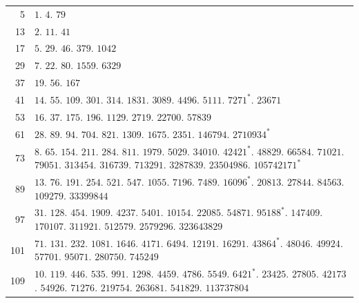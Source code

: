 \begin{longtable}{@{}r|p{\dimexpr\linewidth-38pt\relax}@{}}
5 & $1$. $4$. $79$\\
13 & $2$. $11$. $41$\\
17 & $5$. $29$. $46$. $379$. $1042$\\
29 & $7$. $22$. $80$. $1559$. $6329$\\
37 & $19$. $56$. $167$\\
41 & $14$. $55$. $109$. $301$. $314$. $1831$. $3089$. $4496$. $5111$. $7271^{*}$. $23671$\\
53 & $16$. $37$. $175$. $196$. $1129$. $2719$. $22700$. $57839$\\
61 & $28$. $89$. $94$. $704$. $821$. $1309$. $1675$. $2351$. $146794$. $2710934^{*}$\\
73 & $8$. $65$. $154$. $211$. $284$. $811$. $1979$. $5029$. $34010$. $42421^{*}$. $48829$. $66584$. $71021$. $79051$. $313454$. $316739$. $713291$. $3287839$. $23504986$. $105742171^{*}$\\
89 & $13$. $76$. $191$. $254$. $521$. $547$. $1055$. $7196$. $7489$. $16096^{*}$. $20813$. $27844$. $84563$. $109279$. $33399844$\\
97 & $31$. $128$. $454$. $1909$. $4237$. $5401$. $10154$. $22085$. $54871$. $95188^{*}$. $147409$. $170107$. $311921$. $512579$. $2579296$. $323643829$\\
101 & $71$. $131$. $232$. $1081$. $1646$. $4171$. $6494$. $12191$. $16291$. $43864^{*}$. $48046$. $49924$. $57701$. $95071$. $280750$. $745249$\\
109 & $10$. $119$. $446$. $535$. $991$. $1298$. $4459$. $4786$. $5549$. $6421^{*}$. $23425$. $27805$. $42173$. $54926$. $71276$. $219754$. $263681$. $541829$. $113737804$\\
\end{longtable}\endgroup
